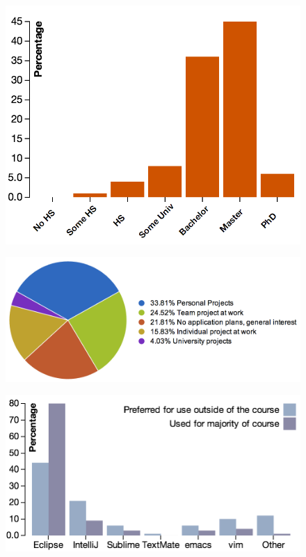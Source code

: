 \documentclass{sig-alternate}
\begin{document}
\begin{figure}[ht!]
  \centering
  \includegraphics[width=0.85\columnwidth]{plots/education.png}
  \caption{}
  \label{fig:education}
\end{figure}

\begin{figure}[ht!]
  \centering
  \includegraphics[width=\columnwidth]{plots/where-apply.png}
  \caption{}
  \label{fig:where-apply}
\end{figure}

\begin{figure}[ht!]
  \centering
  \includegraphics[width=\columnwidth]{plots/ides.png}
  \caption{}
  \label{fig:ides}
\end{figure}
\end{document}
